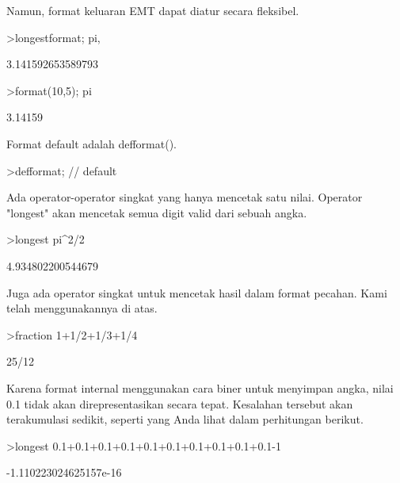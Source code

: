 \documentclass[a4paper,10pt]{article}
\begin{document}
\begin{eulernotebook}
\begin{eulercomment}
Namun, format keluaran EMT dapat diatur secara fleksibel.
\end{eulercomment}
\begin{eulerprompt}
>longestformat; pi,
\end{eulerprompt}
\begin{euleroutput}
  3.141592653589793
\end{euleroutput}
\begin{eulerprompt}
>format(10,5); pi
\end{eulerprompt}
\begin{euleroutput}
    3.14159 
\end{euleroutput}
\begin{eulercomment}
Format default adalah defformat().
\end{eulercomment}
\begin{eulerprompt}
>defformat; // default
\end{eulerprompt}
\begin{eulercomment}
Ada operator-operator singkat yang hanya mencetak satu nilai. Operator
"longest" akan mencetak semua digit valid dari sebuah angka.
\end{eulercomment}
\begin{eulerprompt}
>longest pi^2/2
\end{eulerprompt}
\begin{euleroutput}
        4.934802200544679 
\end{euleroutput}
\begin{eulercomment}
Juga ada operator singkat untuk mencetak hasil dalam format pecahan.
Kami telah menggunakannya di atas.
\end{eulercomment}
\begin{eulerprompt}
>fraction 1+1/2+1/3+1/4
\end{eulerprompt}
\begin{euleroutput}
  25/12
\end{euleroutput}
\begin{eulercomment}
Karena format internal menggunakan cara biner untuk menyimpan angka,
nilai 0.1 tidak akan direpresentasikan secara tepat. Kesalahan
tersebut akan terakumulasi sedikit, seperti yang Anda lihat dalam
perhitungan berikut.
\end{eulercomment}
\begin{eulerprompt}
>longest 0.1+0.1+0.1+0.1+0.1+0.1+0.1+0.1+0.1+0.1-1
\end{eulerprompt}
\begin{euleroutput}
   -1.110223024625157e-16 
\end{euleroutput}

\end{eulernotebook}
\end{document}
